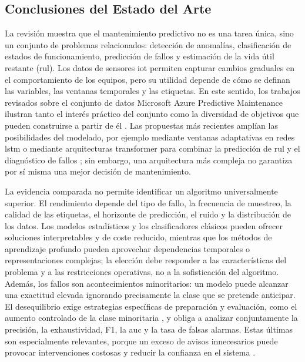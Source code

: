 \documentclass[IB]{TFUOC}
\begin{document}
\subsection{Conclusiones del Estado del Arte}

La revisión muestra que el mantenimiento predictivo no es una tarea única, sino un conjunto de problemas relacionados:
detección de anomalías, clasificación de estados de funcionamiento, predicción de fallos y estimación de la vida útil
restante (\gls{rul}). Los datos de sensores \gls{iot} permiten capturar cambios graduales en el comportamiento de los
equipos, pero su utilidad depende de cómo se definan las variables, las ventanas temporales y las etiquetas. En este
sentido, los trabajos revisados sobre el conjunto de datos Microsoft Azure Predictive Maintenance
\cite{biswas_microsoft_azure_predictive_maintenance} ilustran tanto el interés práctico del conjunto como la diversidad
de objetivos que pueden construirse a partir de él \cite{lizcano2022mantenimiento,d4rklucif3r_predictive_maintenance}.
Las propuestas más recientes amplían las posibilidades del modelado, por ejemplo mediante ventanas adaptativas en redes
\gls{lstm} \cite{adivi2024predictive} o mediante arquitecturas \gls{transformer} para combinar la predicción de
\gls{rul} y el diagnóstico de fallos \cite{liu2026transformer}; sin embargo, una arquitectura más compleja no garantiza
por sí misma una mejor decisión de mantenimiento.

La evidencia comparada no permite identificar un algoritmo universalmente superior. El rendimiento depende del tipo de
fallo, la frecuencia de muestreo, la calidad de las etiquetas, el horizonte de predicción, el ruido y la distribución de
los datos. Los modelos estadísticos y los clasificadores clásicos pueden ofrecer soluciones interpretables y de coste
reducido, mientras que los métodos de aprendizaje profundo pueden aprovechar dependencias temporales o representaciones
complejas; la elección debe responder a las características del problema y a las restricciones operativas, no a la
sofisticación del algoritmo. Además, los fallos son acontecimientos minoritarios: un modelo puede alcanzar una exactitud
elevada ignorando precisamente la clase que se pretende anticipar. El desequilibrio exige estrategias específicas de
preparación y evaluación, como el aumento controlado de la clase minoritaria \cite{kim2023self}, y obliga a analizar
conjuntamente la \gls{precisión}, la \gls{exhaustividad}, F1, la \gls{auc} y la tasa de falsas alarmas. Estas últimas
son especialmente relevantes, porque un exceso de avisos innecesarios puede provocar intervenciones costosas y reducir
la confianza en el sistema \cite{li2014improving}.
\end{document}
